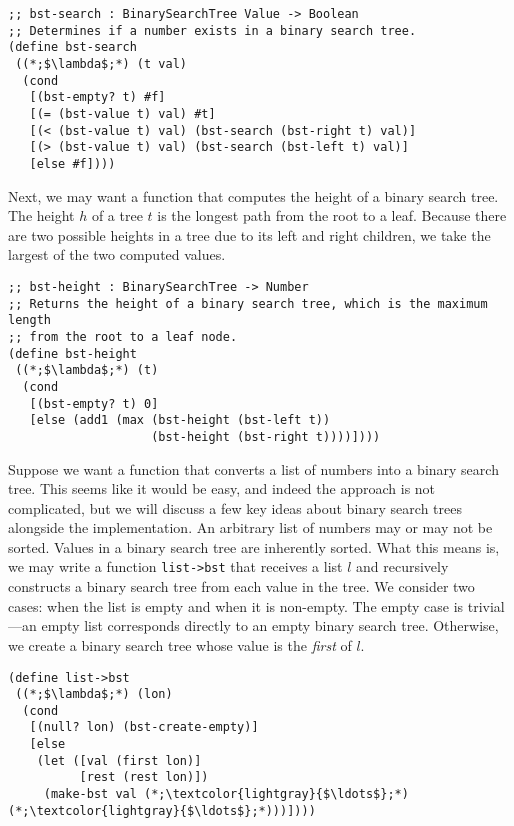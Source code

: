 \begin{cl}[]{}\begin{lstlisting}[language=MyScheme]
;; bst-search : BinarySearchTree Value -> Boolean
;; Determines if a number exists in a binary search tree.
(define bst-search
 ((*;$\lambda$;*) (t val)
  (cond
   [(bst-empty? t) #f]
   [(= (bst-value t) val) #t]
   [(< (bst-value t) val) (bst-search (bst-right t) val)]
   [(> (bst-value t) val) (bst-search (bst-left t) val)]
   [else #f])))
\end{lstlisting}\end{cl}

Next, we may want a function that computes the height of a binary search tree. The height $h$ of a tree $t$ is the longest path from the root to a leaf. Because there are two possible heights in a tree due to its left and right children, we take the largest of the two computed values.

\begin{cl}[]{}\begin{lstlisting}[language=MyScheme]
;; bst-height : BinarySearchTree -> Number
;; Returns the height of a binary search tree, which is the maximum length
;; from the root to a leaf node.
(define bst-height
 ((*;$\lambda$;*) (t)
  (cond
   [(bst-empty? t) 0]
   [else (add1 (max (bst-height (bst-left t))
                    (bst-height (bst-right t))))])))
\end{lstlisting}\end{cl}

Suppose we want a function that converts a list of numbers into a binary search tree. This seems like it would be easy, and indeed the approach is not complicated, but we will discuss a few key ideas about binary search trees alongside the implementation.
An arbitrary list of numbers may or may not be sorted. Values in a binary search tree are inherently sorted. What this means is, we may write a function \texttt{list->bst} that receives a list $l$ and recursively constructs a binary search tree from each value in the tree. We consider two cases: when the list is empty and when it is non-empty. The empty case is trivial---an empty list corresponds directly to an empty binary search tree. Otherwise, we create a binary search tree whose value is the \textit{first} of $l$.

\begin{cl}[]{}\begin{lstlisting}[language=MyScheme]
(define list->bst
 ((*;$\lambda$;*) (lon)
  (cond
   [(null? lon) (bst-create-empty)]
   [else
    (let ([val (first lon)]
          [rest (rest lon)])
     (make-bst val (*;\textcolor{lightgray}{$\ldots$};*) (*;\textcolor{lightgray}{$\ldots$};*)))])))
\end{lstlisting}\end{cl}

